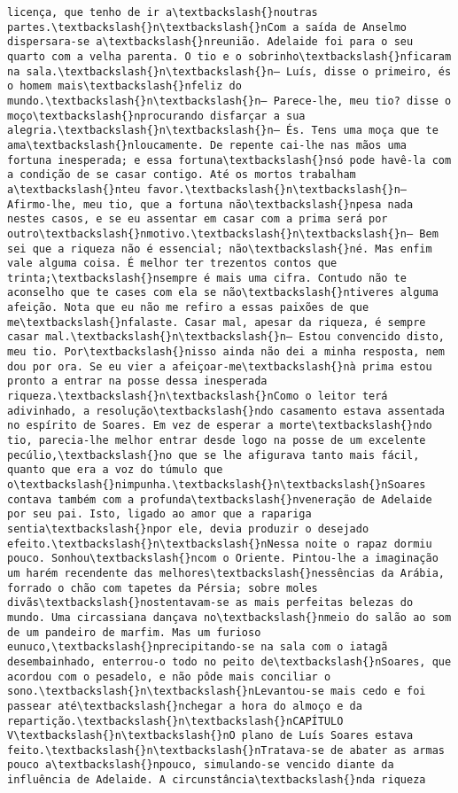\documentclass[11pt]{article}
\begin{document}
\begin{Verbatim}[commandchars=\\\{\}]
licença, que tenho de ir a\textbackslash{}noutras partes.\textbackslash{}n\textbackslash{}nCom a saída de Anselmo dispersara-se a\textbackslash{}nreunião. Adelaide foi para o seu quarto com a velha parenta. O tio e o sobrinho\textbackslash{}nficaram na sala.\textbackslash{}n\textbackslash{}n— Luís, disse o primeiro, és o homem mais\textbackslash{}nfeliz do mundo.\textbackslash{}n\textbackslash{}n— Parece-lhe, meu tio? disse o moço\textbackslash{}nprocurando disfarçar a sua alegria.\textbackslash{}n\textbackslash{}n— És. Tens uma moça que te ama\textbackslash{}nloucamente. De repente cai-lhe nas mãos uma fortuna inesperada; e essa fortuna\textbackslash{}nsó pode havê-la com a condição de se casar contigo. Até os mortos trabalham a\textbackslash{}nteu favor.\textbackslash{}n\textbackslash{}n— Afirmo-lhe, meu tio, que a fortuna não\textbackslash{}npesa nada nestes casos, e se eu assentar em casar com a prima será por outro\textbackslash{}nmotivo.\textbackslash{}n\textbackslash{}n— Bem sei que a riqueza não é essencial; não\textbackslash{}né. Mas enfim vale alguma coisa. É melhor ter trezentos contos que trinta;\textbackslash{}nsempre é mais uma cifra. Contudo não te aconselho que te cases com ela se não\textbackslash{}ntiveres alguma afeição. Nota que eu não me refiro a essas paixões de que me\textbackslash{}nfalaste. Casar mal, apesar da riqueza, é sempre casar mal.\textbackslash{}n\textbackslash{}n— Estou convencido disto, meu tio. Por\textbackslash{}nisso ainda não dei a minha resposta, nem dou por ora. Se eu vier a afeiçoar-me\textbackslash{}nà prima estou pronto a entrar na posse dessa inesperada riqueza.\textbackslash{}n\textbackslash{}nComo o leitor terá adivinhado, a resolução\textbackslash{}ndo casamento estava assentada no espírito de Soares. Em vez de esperar a morte\textbackslash{}ndo tio, parecia-lhe melhor entrar desde logo na posse de um excelente pecúlio,\textbackslash{}no que se lhe afigurava tanto mais fácil, quanto que era a voz do túmulo que o\textbackslash{}nimpunha.\textbackslash{}n\textbackslash{}nSoares contava também com a profunda\textbackslash{}nveneração de Adelaide por seu pai. Isto, ligado ao amor que a rapariga sentia\textbackslash{}npor ele, devia produzir o desejado efeito.\textbackslash{}n\textbackslash{}nNessa noite o rapaz dormiu pouco. Sonhou\textbackslash{}ncom o Oriente. Pintou-lhe a imaginação um harém recendente das melhores\textbackslash{}nessências da Arábia, forrado o chão com tapetes da Pérsia; sobre moles divãs\textbackslash{}nostentavam-se as mais perfeitas belezas do mundo. Uma circassiana dançava no\textbackslash{}nmeio do salão ao som de um pandeiro de marfim. Mas um furioso eunuco,\textbackslash{}nprecipitando-se na sala com o iatagã desembainhado, enterrou-o todo no peito de\textbackslash{}nSoares, que acordou com o pesadelo, e não pôde mais conciliar o sono.\textbackslash{}n\textbackslash{}nLevantou-se mais cedo e foi passear até\textbackslash{}nchegar a hora do almoço e da repartição.\textbackslash{}n\textbackslash{}nCAPÍTULO V\textbackslash{}n\textbackslash{}nO plano de Luís Soares estava feito.\textbackslash{}n\textbackslash{}nTratava-se de abater as armas pouco a\textbackslash{}npouco, simulando-se vencido diante da influência de Adelaide. A circunstância\textbackslash{}nda riqueza 
\end{Verbatim}
\end{document}
